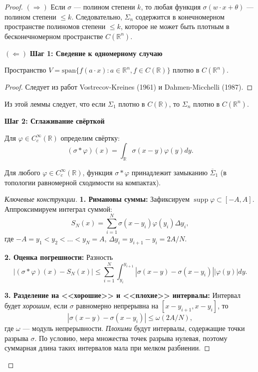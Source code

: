 \documentclass[../NDCNNAI_main.tex]{subfiles}
\begin{document}
\begin{proof}
$(\Rightarrow)$
Если $\sigma$ --- полином степени $k$, то любая функция $\sigma(w \cdot x + \theta)$ --- полином степени $\leq k$. Следовательно, $\Sigma_n$ содержится в конечномерном пространстве полиномов степени $\leq k$, которое не может быть плотным в бесконечномерном пространстве $C(\mathbb{R}^n)$.

$(\Leftarrow)$
\textbf{Шаг 1: Сведение к одномерному случаю}

\begin{lemma}
Пространство $V = \text{span}\{f(a \cdot x)\colon a \in \mathbb{R}^n, f \in C(\mathbb{R})\}$ плотно в $C(\mathbb{R}^n)$.
\end{lemma}

\begin{proof}
Следует из работ Vostrecov-Kreines (1961) и Dahmen-Micchelli (1987).
\end{proof}

Из этой леммы следует, что если $\Sigma_1$ плотно в $C(\mathbb{R})$, то $\Sigma_n$ плотно в $C(\mathbb{R}^n)$.

\noindent
\textbf{Шаг 2: Сглаживание свёрткой}

Для $\varphi \in C^\infty_c(\mathbb{R})$ определим свёртку:
\[
(\sigma * \varphi)(x) = \int_{\mathbb{R}} \sigma(x-y) \varphi(y) dy.
\]

\begin{lemma}
Для любого $\varphi \in C^\infty_c(\mathbb{R})$, функция $\sigma * \varphi$ принадлежит замыканию $\overline{\Sigma}_1$ (в топологии равномерной сходимости на компактах).
\end{lemma}

\begin{proof}[Ключевые конструкции]
\textbf{1. Римановы суммы:} Зафиксируем $\operatorname*{supp} \varphi \subset [-A, A]$. Аппроксимируем интеграл суммой:
\[
S_N(x) = \sum_{i=1}^N \sigma(x - y_i) \varphi(y_i) \Delta y_i,
\]
где $-A = y_1 < y_2 < \dots < y_N = A$, $\Delta y_i = y_{i+1} - y_i = 2A/N$.

\textbf{2. Оценка погрешности:} Разность
\[
|(\sigma * \varphi)(x) - S_N(x)| \leq \sum_{i=1}^N \int_{y_i}^{y_{i+1}} |\sigma(x-y) - \sigma(x-y_i)| |\varphi(y)| dy.
\]

\textbf{3. Разделение на <<хорошие>> и <<плохие>> интервалы:}
Интервал будет \emph{хорошим}, если $\sigma$ равномерно непрерывна на $[x-y_{i+1}, x-y_i]$, то
\[
|\sigma(x-y) - \sigma(x-y_i)| \leq \omega(2A/N),
\]
где $\omega$ --- модуль непрерывности.
\emph{Плохими} будут интервалы, содержащие точки разрыва $\sigma$. По условию, мера множества точек разрыва нулевая, поэтому суммарная длина таких интервалов мала при мелком разбиении.


\end{proof}
\end{proof}
\end{document}
